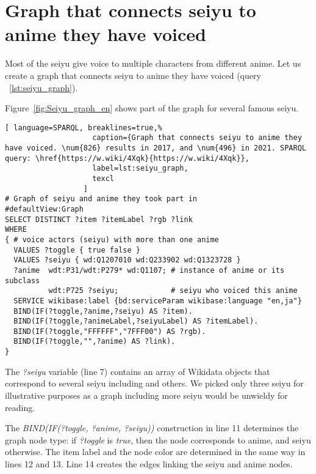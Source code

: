 \section{Graph that connects seiyu to anime they have voiced}

Most of the seiyu give voice to multiple characters from different anime. Let us create a graph that connects seiyu to anime they have voiced (query ~\ref{lst:seiyu_graph}).

Figure~\ref{fig:Seiyu_graph_en} shows part of the graph for several famous seiyu.

\begin{widepar}%
\captionsetup[lstlisting]{format=llapwide18}%
%
\begin{lstlisting}[ language=SPARQL, breaklines=true,%
                    caption={Graph that connects seiyu to anime they have voiced. \num{826} results in 2017, and \num{496} in 2021. SPARQL query: \href{https://w.wiki/4Xqk}{https://w.wiki/4Xqk}},
                    label=lst:seiyu_graph,
                    texcl
                  ]
# Graph of seiyu and anime they took part in
#defaultView:Graph
SELECT DISTINCT ?item ?itemLabel ?rgb ?link
WHERE
{ # voice actors (seiyu) with more than one anime
  VALUES ?toggle { true false }
  VALUES ?seiyu { wd:Q1207010 wd:Q233902 wd:Q1323728 }
  ?anime  wdt:P31/wdt:P279* wd:Q1107; # instance of anime or its subclass
          wdt:P725 ?seiyu;            # seiyu who voiced this anime 
  SERVICE wikibase:label {bd:serviceParam wikibase:language "en,ja"}
  BIND(IF(?toggle,?anime,?seiyu) AS ?item).
  BIND(IF(?toggle,?animeLabel,?seiyuLabel) AS ?itemLabel).
  BIND(IF(?toggle,"FFFFFF","7FFF00") AS ?rgb).
  BIND(IF(?toggle,"",?anime) AS ?link).
}
\end{lstlisting}%
\end{widepar}%

The \emph{?seiyu} variable (line 7) contains an array of Wikidata objects that correspond to several seiyu including  and others. We picked only three seiyu for illustrative purposes as a graph including more seiyu would be unwieldy for reading.

The \emph{BIND(IF(?toggle, ?anime, ?seiyu))} construction in line \num{11} determines the graph node type: if \emph{?toggle} is \emph{true}, then the node corresponds to anime, and seiyu otherwise. The item label and the node color are determined in the same way in lines \num{12} and \num{13}. Line \num{14} creates the edges linking the seiyu and anime nodes.

